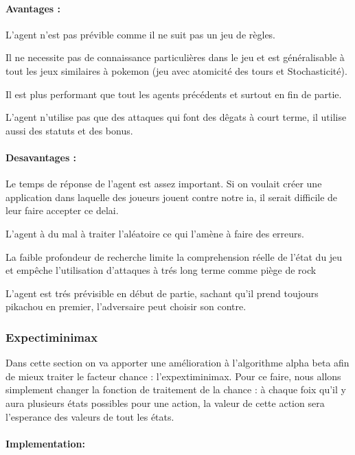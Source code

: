             \paragraph{Avantages :}
                L'agent n'est pas prévible comme il ne suit pas un jeu de règles.
                
                Il ne necessite pas de connaissance particulières dans le jeu et est généralisable à tout les jeux similaires à pokemon (jeu avec atomicité des tours et Stochasticité).
                
                Il est plus performant que tout les agents précédents et surtout en fin de partie.
                
                L'agent n'utilise pas que des attaques qui font des dêgats à court terme, il utilise aussi des statuts et des bonus.
            \paragraph{Desavantages :}
                Le temps de réponse de l'agent est assez important. Si on voulait créer une application dans laquelle des joueurs jouent contre notre ia, il serait difficile de leur faire accepter ce delai.
                
                L'agent à du mal à traiter l'aléatoire ce qui l'amène à faire des erreurs.
                
                La faible profondeur de recherche limite la comprehension réelle de l'état du jeu et empêche l'utilisation d'attaques à trés long terme comme piège de rock
                
                L'agent est trés prévisible en début de partie, sachant qu'il prend toujours pikachou en premier, l'adversaire peut choisir son contre.
                
        \subsubsection{Expectiminimax}
            Dans cette section on va apporter une amélioration à l'algorithme alpha beta afin de mieux traiter le facteur chance : l'expextiminimax.
            Pour ce faire, nous allons simplement changer la fonction de traitement de la chance : à chaque foix qu'il y aura plusieurs états possibles pour une action, la valeur de cette action sera l'esperance des valeurs de tout les états.
            \paragraph{Implementation:}
                
